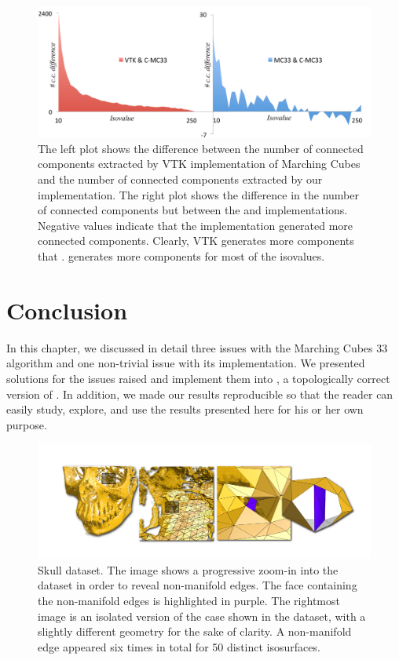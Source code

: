 \begin{figure}[b]
       \includegraphics[width=1\linewidth]{chapter4/figures/aneurism_cc_vtk.pdf}
       \caption{\label{fig:cc} The left plot shows the difference between the number of connected components extracted by VTK implementation of Marching Cubes and the number of connected components extracted by our \cmc{} implementation. The right plot shows the difference in the number of connected components but between the \mc{} and  \cmc{} implementations. Negative values indicate that the \cmc{} implementation generated more connected components.
Clearly, VTK generates more components that \cmc{}. \mc{} generates more components for most of the isovalues. }
\end{figure}

\section{Conclusion}
\label{conclusion}

In this chapter, we discussed in detail three issues with  the Marching Cubes 33 algorithm and one non-trivial issue with its implementation. 
We presented solutions for the issues raised and implement them into \cmc, a topologically correct version of \mc. In addition, we made our results reproducible so that the reader can easily study, explore, and use the results presented here for his or her own purpose. 

\begin{figure}[b]
     \centering
     \includegraphics[width=0.9\linewidth]{chapter4/figures/skull.png}
     \caption{Skull dataset. The image shows a progressive zoom-in into the dataset in order to reveal non-manifold edges. The face containing the non-manifold edges is highlighted  in purple. The rightmost image is an isolated version of the case shown in the dataset, with a slightly different geometry for the sake of clarity. A non-manifold edge appeared six times in total for 50 distinct isosurfaces.}
     \label{fig:non-manifold-real-data}
\end{figure}
